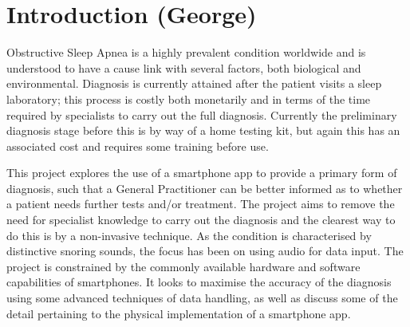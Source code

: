 \chapter{Introduction (George)}
\label{ch:introduction}

Obstructive Sleep Apnea is a highly prevalent condition worldwide and is understood to have a cause link with several factors, both biological and environmental. Diagnosis is currently attained after the patient visits a sleep laboratory; this process is costly both monetarily and in terms of the time required by specialists to carry out the full diagnosis. Currently the preliminary diagnosis stage before this is by way of a home testing kit, but again this has an associated cost and requires some training before use.

This project explores the use of a smartphone app to provide a primary form of diagnosis, such that a General Practitioner can be better informed as to whether a patient needs further tests and/or treatment. The project aims to remove the need for specialist knowledge to carry out the diagnosis and the clearest way to do this is by a non-invasive technique. As the condition is characterised by distinctive snoring sounds, the focus has been on using audio for data input. The project is constrained by the commonly available hardware and software capabilities of smartphones. It looks to maximise the accuracy of the diagnosis using some advanced techniques of data handling, as well as discuss some of the detail pertaining to the physical implementation of a smartphone app.